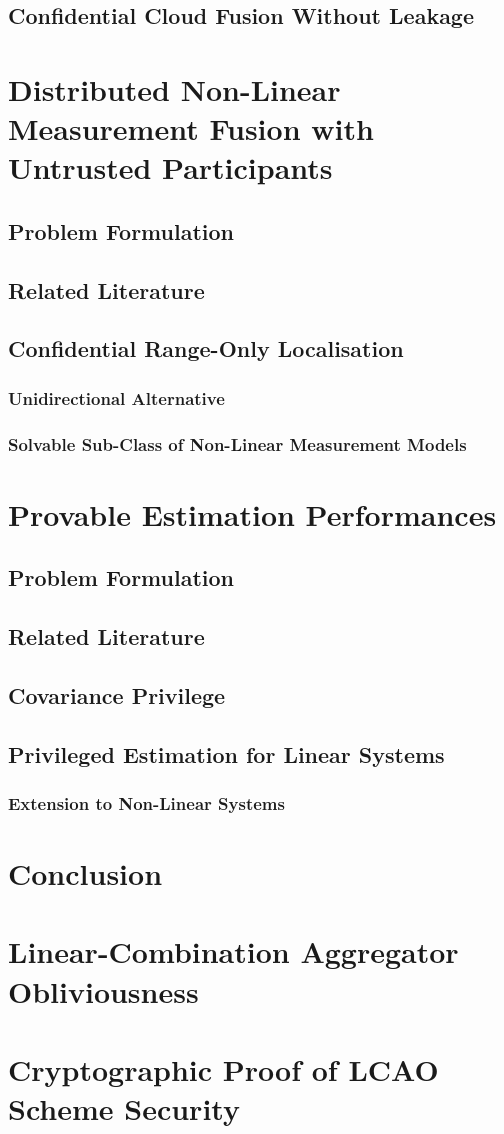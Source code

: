 \documentclass[oneside]{scrbook}
\begin{document}
\section{Confidential Cloud Fusion Without Leakage}

\chapter{Distributed Non-Linear Measurement Fusion with Untrusted Participants}
\section{Problem Formulation}
\section{Related Literature}
\section{Confidential Range-Only Localisation}
\subsection{Unidirectional Alternative}
\subsection{Solvable Sub-Class of Non-Linear Measurement Models}

\chapter{Provable Estimation Performances}
\section{Problem Formulation}
\section{Related Literature}
\section{Covariance Privilege}
\section{Privileged Estimation for Linear Systems}
\subsection{Extension to Non-Linear Systems}

\chapter{Conclusion}


\appendix

\chapter{Linear-Combination Aggregator Obliviousness}

\chapter{Cryptographic Proof of LCAO Scheme Security}


\backmatter
\end{document}
